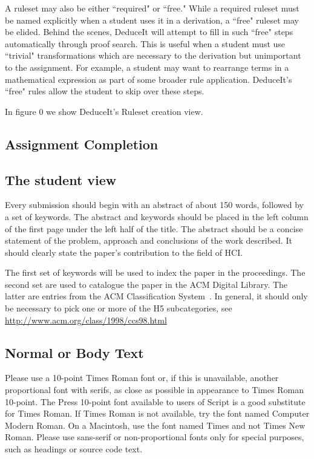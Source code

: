 \documentclass{sigchi}
\begin{document}
A ruleset may also be either ``required" or ``free." While a required ruleset must be named explicitly when a student uses it in a derivation, a ``free" ruleset may be elided. Behind the scenes, DeduceIt will attempt to fill in such ``free" steps automatically through proof search. This is useful when a student must use ``trivial" transformations which are necessary to the derivation but unimportant to the assignment. For example, a student may want to rearrange terms in a mathematical expression as part of some broader rule application. DeduceIt's ``free" rules allow the student to skip over these steps.  

In figure 0 we show DeduceIt's Ruleset creation view.

\subsection{Assignment Completion}


\subsection{The student view}

Every submission should begin with an abstract of about 150 words,
followed by a set of keywords. The abstract and keywords should be
placed in the left column of the first page under the left half of the
title. The abstract should be a concise statement of the problem,
approach and conclusions of the work described.  It should clearly
state the paper's contribution to the field of HCI.

The first set of keywords will be used to index the paper in the
proceedings. The second set are used to catalogue the paper in the ACM
Digital Library. The latter are entries from the ACM Classification
System~\cite{acm_categories}.  In general, it should only be necessary
to pick one or more of the H5 subcategories, see
\url{http://www.acm.org/class/1998/ccs98.html}

\subsection{Normal or Body Text}

Please use a 10-point Times Roman font or, if this is unavailable,
another proportional font with serifs, as close as possible in
appearance to Times Roman 10-point. The Press 10-point font available
to users of Script is a good substitute for Times Roman. If Times
Roman is not available, try the font named Computer Modern Roman. On a
Macintosh, use the font named Times and not Times New Roman. Please
use sans-serif or non-proportional fonts only for special purposes,
such as headings or source code text.
\end{document}
